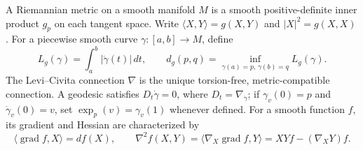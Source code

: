 A Riemannian metric on a smooth manifold \(M\) is a smooth positive-definite inner product \(g_p\) on each tangent space. Write \(\langle X,Y\rangle=g(X,Y)\) and \(|X|^2=g(X,X)\). For a piecewise smooth curve \(\gamma:[a,b]\to M\), define
\[
L_g(\gamma)=\int_a^b|\dot\gamma(t)|\,dt,\qquad
d_g(p,q)=\inf_{\gamma(a)=p,\,\gamma(b)=q}L_g(\gamma).
\]
The Levi--Civita connection \(\nabla\) is the unique torsion-free, metric-compatible connection. A geodesic satisfies \(D_t\dot\gamma=0\), where \(D_t=\nabla_{\dot\gamma}\); if \(\gamma_v(0)=p\) and \(\dot\gamma_v(0)=v\), set \(\exp_p(v)=\gamma_v(1)\) whenever defined. For a smooth function \(f\), its gradient and Hessian are characterized by
\[
\langle\operatorname{grad}f,X\rangle=df(X),\qquad
\nabla^2f(X,Y)=\langle\nabla_X\operatorname{grad}f,Y\rangle
=XYf-(\nabla_XY)f.
\]